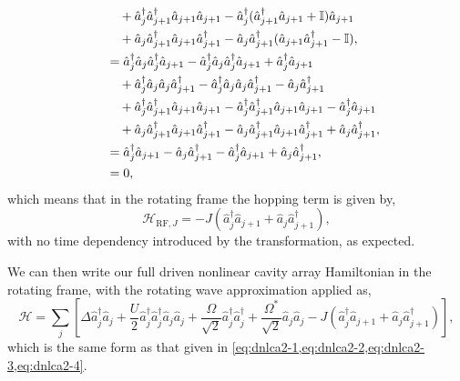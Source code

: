 \begin{align}
	 &\qquad + \hat{a}_{j}^{\dagger}\hat{a}_{j+1}^{\dagger}\hat{a}_{j+1}\hat{a}_{j+1} - \hat{a}_{j}^{\dagger}(\hat{a}_{j+1}^{\dagger}\hat{a}_{j+1} + \mathbb{I})\hat{a}_{j+1} \notag \\
	 &\qquad + \hat{a}_{j}\hat{a}_{j+1}^{\dagger}\hat{a}_{j+1}\hat{a}_{j+1}^{\dagger} - \hat{a}_{j}\hat{a}_{j+1}^{\dagger}(\hat{a}_{j+1}\hat{a}_{j+1}^{\dagger} - \mathbb{I}), \notag \\
	 &\quad= \hat{a}_{j}^{\dagger}\hat{a}_{j}\hat{a}_{j}^{\dagger}\hat{a}_{j+1} - \hat{a}_{j}^{\dagger}\hat{a}_{j}\hat{a}_{j}^{\dagger}\hat{a}_{j+1} + \hat{a}_{j}^{\dagger}\hat{a}_{j+1} \notag \\
	 &\qquad + \hat{a}_{j}^{\dagger}\hat{a}_{j}\hat{a}_{j}\hat{a}_{j+1}^{\dagger} - \hat{a}_{j}^{\dagger}\hat{a}_{j}\hat{a}_{j}\hat{a}_{j+1}^{\dagger} - \hat{a}_{j}\hat{a}_{j+1}^{\dagger} \notag \\
	 &\qquad + \hat{a}_{j}^{\dagger}\hat{a}_{j+1}^{\dagger}\hat{a}_{j+1}\hat{a}_{j+1} - \hat{a}_{j}^{\dagger}\hat{a}_{j+1}^{\dagger}\hat{a}_{j+1}\hat{a}_{j+1} - \hat{a}_{j}^{\dagger}\hat{a}_{j+1} \notag \\
	 &\qquad + \hat{a}_{j}\hat{a}_{j+1}^{\dagger}\hat{a}_{j+1}\hat{a}_{j+1}^{\dagger} - \hat{a}_{j}\hat{a}_{j+1}^{\dagger}\hat{a}_{j+1}\hat{a}_{j+1}^{\dagger} + \hat{a}_{j}\hat{a}_{j+1}^{\dagger}, \notag \\
	 &\quad= \hat{a}_{j}^{\dagger}\hat{a}_{j+1} - \hat{a}_{j}\hat{a}_{j+1}^{\dagger} - \hat{a}_{j}^{\dagger}\hat{a}_{j+1} + \hat{a}_{j}\hat{a}_{j+1}^{\dagger}, \notag \\
	 &\quad= 0,
	\label{eq:rot27}
\end{align}
which means that in the rotating frame the hopping term is given by,
\begin{equation}
	\mathcal{H}_{\mathrm{RF},J} = -J\left(\hat{a}_{j}^{\dagger}\hat{a}_{j+1} + \hat{a}_{j}\hat{a}_{j+1}^{\dagger}\right),
	\label{eq:rot28}
\end{equation}
with no time dependency introduced by the transformation, as expected.

We can then write our full driven nonlinear cavity array Hamiltonian in the rotating frame, with the rotating wave approximation applied as,
\begin{equation}
	\mathcal{H} = \sum_{j}\left[\Delta\hat{a}_{j}^{\dagger}\hat{a}_{j} + \frac{U}{2}\hat{a}_{j}^{\dagger}\hat{a}_{j}^{\dagger}\hat{a}_{j}\hat{a}_{j} + \frac{\Omega}{\sqrt{2}}\hat{a}_{j}^{\dagger}\hat{a}_{j}^{\dagger} + \frac{\Omega^{*}}{\sqrt{2}}\hat{a}_{j}\hat{a}_{j} - J\left(\hat{a}_{j}^{\dagger}\hat{a}_{j+1} + \hat{a}_{j}\hat{a}_{j+1}^{\dagger}\right)\right],
	\label{eq:rot29}
\end{equation}
which is the same form as that given in \cref{eq:dnlca2-1,eq:dnlca2-2,eq:dnlca2-3,eq:dnlca2-4}.
